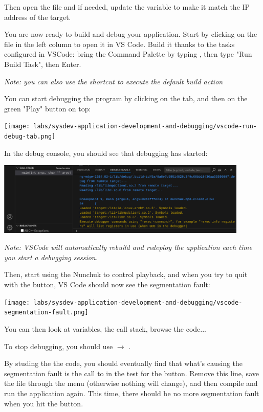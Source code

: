 Then open the  file and if needed, update the  variable
to make it match the IP address of the target.

You are now ready to build and debug your application. Start by clicking on
the  file in the left column to open it in VS
Code. Build it thanks to the tasks configured in VSCode: bring the Command
Palette by typing , then type "Run Build Task", then
Enter.

\textit{Note: you can also use the  shortcut to execute the
default build action}

You can start debugging the program by clicking on the 
tab, and then on the green "Play" button on top:

\texttt{[image: labs/sysdev-application-development-and-debugging/vscode-run-debug-tab.png]}

In the debug console, you should see that debugging has started:

\includegraphics[width=12cm]{labs/sysdev-application-development-and-debugging/vscode-debugging-started.png}

\textit{Note: VSCode will automatically rebuild and redeploy the
application each time you start a debugging session.}

Then, start using the Nunchuk to control playback, and when you try to
quit with the  button, VS Code should now see the segmentation
fault:

\texttt{[image: labs/sysdev-application-development-and-debugging/vscode-segmentation-fault.png]}

You can then look at variables, the call stack, browse the code...

To stop debugging, you should use  $\rightarrow$ .

By studing the the code, you should eventually find that what's causing
the segmentation fault is the call to  in the test for the
 button. Remove this line, save the file through the 
menu (otherwise nothing will change), and then compile and run the
application again. This time, there should be no more segmentation fault
when you hit the  button.

